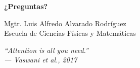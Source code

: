 \documentclass[aspectratio=169]{beamer}
\begin{document}
\begin{frame}
    \centering
    \Huge \textbf{¿Preguntas?}
    
    \vspace{0.5cm}
    \normalsize
    Mgtr. Luis Alfredo Alvarado Rodríguez\\
    \small Escuela de Ciencias Físicas y Matemáticas
    
    \vspace{0.5cm}
    \footnotesize
    \textit{``Attention is all you need.''\\--- Vaswani et al., 2017}
\end{frame}
\end{document}
